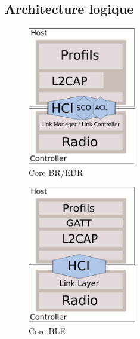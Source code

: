 \subsection{Architecture logique}
\begin{frame}


\begin{minipage}[t]{0.47\linewidth}
	\begin{figure}
		\includegraphics[height=6cm]{img/arch_core.png}
		\caption{Core BR/EDR}
	\end{figure}
\end{minipage}
\begin{minipage}[t]{0.45\linewidth}
	\begin{figure}
		\includegraphics[height=6cm]{img/arch_core_ble.png}
		\caption{Core BLE}
	\end{figure}
\end{minipage}
\end{frame}
